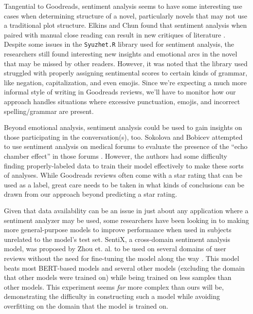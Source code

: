 Tangential to Goodreads, sentiment analysis seems to have some interesting use cases when determining structure of
a novel, particularly novels that may not use a traditional plot structure. Elkins and Chun found that sentiment
analysis when paired with manual close reading can result in new critiques of literature \cite{Elkins2019}. Despite
some issues in the \texttt{Syuzhet.R} library used for sentiment analysis, the researchers still found interesting
new insights and emotional arcs in the novel that may be missed by other readers. However, it was noted that the
library used struggled with properly assigning sentimental scores to certain kinds of grammar, like negation,
capitalization, and even emojis. Since we're expecting a much more informal style of writing in Goodreads
reviews, we'll have to monitor how our approach handles situations where excessive punctuation, emojis, and
incorrect spelling/grammar are present.

Beyond emotional analysis, sentiment analysis could be used to gain insights on those participating in the
conversation(s), too. Sokolova and Bobicev attempted to use sentiment analysis on medical forums to evaluate
the presence of the ``echo chamber effect'' in those forums \cite{Sokolova2020}. However, the authors had some
difficulty finding properly-labeled data to train their model effectively to make these sorts of analyses.
While Goodreads reviews often come with a star rating that can be used as a label, great care needs to be
taken in what kinds of conclusions can be drawn from our approach beyond predicting a star rating.

Given that data availability can be an issue in just about any application where a sentiment analyzer may
be used, some researchers have been looking in to making more general-purpose models to improve performance
when used in subjects unrelated to the model's test set. SentiX, a cross-domain sentiment analysis model, was
proposed by Zhou et. al. to be used on several domains of user reviews without the need for fine-tuning the model
along the way \cite{Zhou2020}. This model beats most BERT-based models and several other models (excluding the domain that other
models were trained on) while being trained on less samples than other models. This experiment seems \textit{far} more
complex than ours will be, demonstrating the difficulty in constructing such a model while avoiding overfitting
on the domain that the model is trained on.

